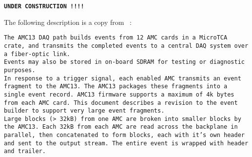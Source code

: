\textbf{\texttt{UNDER CONSTRUCTION !!!!}}

The following description is a copy from ~\cite{AMC13}:

\texttt{The AMC13 DAQ path builds events from 12 AMC cards in a MicroTCA crate,
and transmits the completed events to a central DAQ system over a fiber-optic link.}\\
\texttt{Events may also be stored in on-board SDRAM for testing or diagnostic purposes.}\\
\texttt{In response to a trigger signal, each enabled AMC transmits an event fragment to the AMC13. 
The AMC13 packages these fragments into a single event record. AMC13 firmware supports a maximum of 4k bytes from each
AMC card. This document describes a revision to the event builder to support very large event fragments.}\\
\texttt{Large blocks (> 32kB) from one AMC are broken into smaller blocks by the AMC13. Each 32kB from each AMC are read across the backplane in parallel,
then concatenated to form blocks, each with it's own header and sent to the output stream. The entire event is wrapped with header and trailer.}

\clearpage

